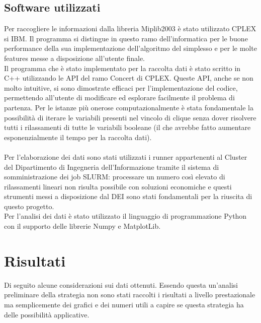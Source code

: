 \documentclass[12pt,a4paper,twoside,openright]{book}
\begin{document}
\section{Software utilizzati}
Per raccogliere le informazioni dalla libreria Miplib2003 è stato utilizzato CPLEX si IBM.
Il programma si distingue in questo ramo dell'informatica per le buone performance della 
sua implementazione dell'algoritmo del simplesso e per le molte features messe a 
disposizione all'utente finale.\\
Il programma che è stato implementato per la raccolta dati è stato scritto in C++ utilizzando 
le API del ramo Concert di CPLEX. Queste API, anche se non molto intuitive,
si sono dimostrate efficaci per l'implementazione del codice, permettendo all'utente di 
modificare ed esplorare facilmente il problema di partenza. Per le istanze più onerose 
computazionalmente è stata fondamentale la possibilità di iterare le variabili presenti nel
vincolo di clique senza dover risolvere tutti i rilassamenti di tutte le variabili booleane 
(il che avrebbe fatto aumentare esponenzialmente il tempo per la raccolta dati).\\\\

Per l'elaborazione dei dati sono stati utilizzati i runner appartenenti al Cluster del Dipartimento di Ingegneria 
dell'Informazione tramite il sistema di somministrazione dei job SLURM: 
processare un numero così elevato di rilassamenti lineari non risulta possibile con soluzioni 
economiche e questi strumenti messi a disposizione dal DEI sono stati fondamentali per 
la riuscita di questo progetto.
\\
Per l'analisi dei dati è stato utilizzato il linguaggio di programmazione Python con il supporto delle 
librerie Numpy e MatplotLib.

\chapter{Risultati}
Di seguito alcune considerazioni sui dati ottenuti. Essendo questa un'analisi preliminare della strategia
non sono stati raccolti i risultati a livello prestazionale ma semplicemente dei grafici e dei numeri 
utili a capire se questa strategia ha delle possibilità applicative.
\end{document}
